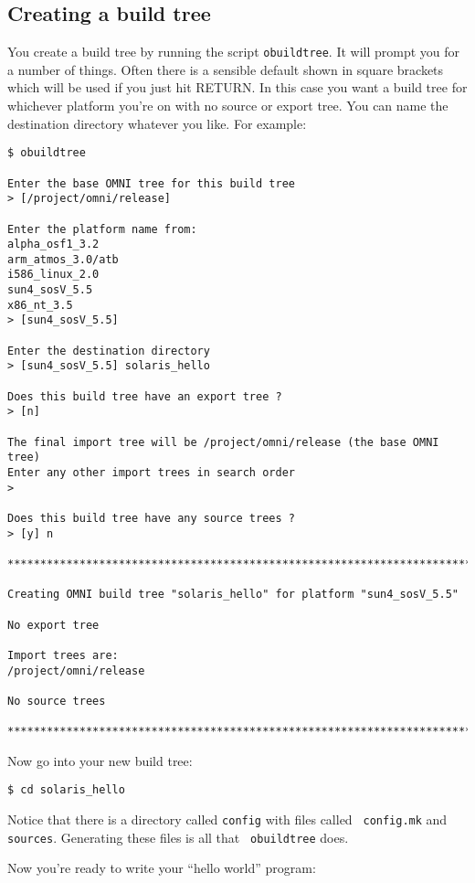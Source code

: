 \documentclass[11pt,twoside,onecolumn]{article}
\begin{document}
\subsection{Creating a build tree}

You create a build tree by running the script {\tt obuildtree}.  It will prompt
you for a number of things.  Often there is a sensible default shown in square
brackets which will be used if you just hit RETURN.  In this case you want a
build tree for whichever platform you're on with no source or export tree.  You
can name the destination directory whatever you like.  For example:

{\small \begin{verbatim}
$ obuildtree

Enter the base OMNI tree for this build tree
> [/project/omni/release] 

Enter the platform name from:
alpha_osf1_3.2
arm_atmos_3.0/atb
i586_linux_2.0
sun4_sosV_5.5
x86_nt_3.5
> [sun4_sosV_5.5] 

Enter the destination directory
> [sun4_sosV_5.5] solaris_hello

Does this build tree have an export tree ?
> [n] 

The final import tree will be /project/omni/release (the base OMNI tree)
Enter any other import trees in search order
> 

Does this build tree have any source trees ?
> [y] n

************************************************************************

Creating OMNI build tree "solaris_hello" for platform "sun4_sosV_5.5"

No export tree

Import trees are:
/project/omni/release

No source trees

************************************************************************

\end{verbatim}}

Now go into your new build tree:

{\small \begin{verbatim}
$ cd solaris_hello
\end{verbatim}}

Notice that there is a directory called {\tt config} with files called {\tt
config.mk} and {\tt sources}.  Generating these files is all that {\tt
obuildtree} does.

Now you're ready to write your ``hello world'' program:
\end{document}
